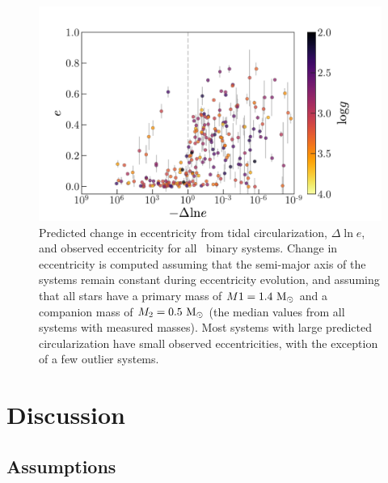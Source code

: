 \documentclass[modern, letterpaper]{aastex62}
\newcommand{\apogee}{\project{\acronym{APOGEE}}}
\begin{document}
\begin{figure}[h]
\begin{center}
\includegraphics[width=\textwidth]{dlne}
\end{center}
\caption{%
Predicted change in eccentricity from tidal circularization, $\Delta \ln e$, and
observed eccentricity for all \apogee\ binary systems.
Change in eccentricity is computed assuming that the semi-major axis of the
systems remain constant during eccentricity evolution, and assuming that all
stars have a primary mass of $M1 = 1.4~\mathrm{M}_\odot$ and a companion mass of $M_2 =
0.5~\mathrm{M}_\odot$ (the median values from all systems with measured masses).
Most systems with large predicted circularization have small observed
eccentricities, with the exception of a few outlier systems.
\label{fig:dlne}
}
\end{figure}

\section{Discussion} \label{sec:discussion}

\subsection{Assumptions}
\end{document}
